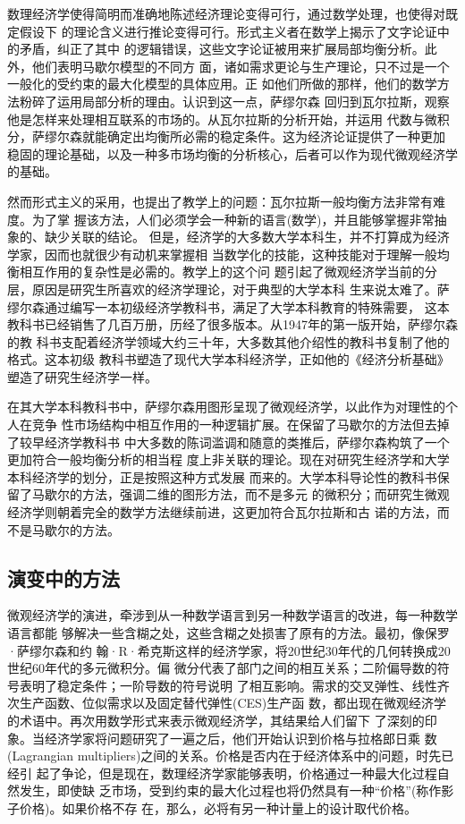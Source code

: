 数理经济学使得简明而准确地陈述经济理论变得可行，通过数学处理，也使得对既定假设下
的理论含义进行推论变得可行。形式主义者在数学上揭示了文字论证中的矛盾，纠正了其中
的逻辑错误，这些文字论证被用来扩展局部均衡分析。此外，他们表明马歇尔模型的不同方
面，诸如需求更论与生产理论，只不过是一个一般化的受约束的最大化模型的具体应用。正
如他们所做的那样，他们的数学方法粉碎了运用局部分析的理由。认识到这一点，萨缪尔森
回归到瓦尔拉斯，观察他是怎样来处理相互联系的市场的。从瓦尔拉斯的分析开始，并运用
代数与微积分，萨缪尔森就能确定出均衡所必需的稳定条件。这为经济论证提供了一种更加
稳固的理论基础，以及一种多市场均衡的分析核心，后者可以作为现代微观经济学的基础。

然而形式主义的采用，也提出了教学上的问题：瓦尔拉斯一般均衡方法非常有难度。为了掌
握该方法，人们必须学会一种新的语言(数学)，并且能够掌握非常抽象的、缺少关联的结论。
但是，经济学的大多数大学本科生，并不打算成为经济学家，因而也就很少有动机来掌握相
当数学化的技能，这种技能对于理解一般均衡相互作用的复杂性是必需的。教学上的这个问
题引起了微观经济学当前的分层，原因是研究生所喜欢的经济学理论，对于典型的大学本科
生来说太难了。萨缪尔森通过编写一本初级经济学教科书，满足了大学本科教育的特殊需要，
这本教科书已经销售了几百万册，历经了很多版本。从1947年的第一版开始，萨缪尔森的教
科书支配着经济学领域大约三十年，大多数其他介绍性的教科书复制了他的格式。这本初级
教科书塑造了现代大学本科经济学，正如他的《经济分析基础》塑造了研究生经济学一样。

在其大学本科教科书中，萨缪尔森用图形呈现了微观经济学，以此作为对理性的个人在竞争
性市场结构中相互作用的一种逻辑扩展。在保留了马歇尔的方法但去掉了较早经济学教科书
中大多数的陈词滥调和随意的类推后，萨缪尔森构筑了一个更加符合一般均衡分析的相当程
度上非关联的理论。现在对研究生经济学和大学本科经济学的划分，正是按照这种方式发展
而来的。大学本科导论性的教科书保留了马歇尔的方法，强调二维的图形方法，而不是多元
的微积分；而研究生微观经济学则朝着完全的数学方法继续前进，这更加符合瓦尔拉斯和古
诺的方法，而不是马歇尔的方法。

\subsection{演变中的方法}

微观经济学的演进，牵涉到从一种数学语言到另一种数学语言的改进，每一种数学语言都能
够解决一些含糊之处，这些含糊之处损害了原有的方法。最初，像保罗·萨缪尔森和约
翰·R·希克斯这样的经济学家，将20世纪30年代的几何转换成20世纪60年代的多元微积分。偏
微分代表了部门之间的相互关系；二阶偏导数的符号表明了稳定条件；一阶导数的符号说明
了相互影响。需求的交叉弹性、线性齐次生产函数、位似需求以及固定替代弹性(CES)生产函
数，都出现在微观经济学的术语中。再次用数学形式来表示微观经济学，其结果给人们留下
了深刻的印象。当经济学家将问题研究了一遍之后，他们开始认识到价格与拉格郎日乘
数(Lagrangian multipliers)之间的关系。价格是否内在于经济体系中的问题，时先已经引
起了争论，但是现在，数理经济学家能够表明，价格通过一种最大化过程自然发生，即使缺
乏市场，受到约束的最大化过程也将仍然具有一种“价格”(称作影子价格)。如果价格不存
在，那么，必将有另一种计量上的设计取代价格。

